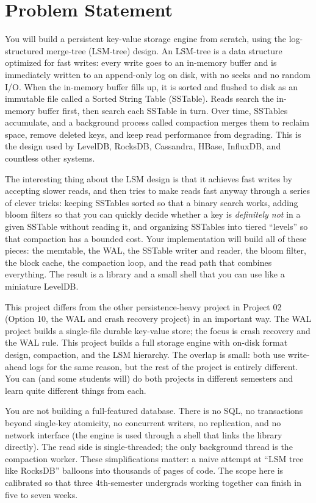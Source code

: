 \documentclass[11pt,a4paper]{article}
\begin{document}

\section{Problem Statement}

You will build a persistent key-value storage engine from scratch, using the log-structured merge-tree (LSM-tree) design. An LSM-tree is a data structure optimized for fast writes: every write goes to an in-memory buffer and is immediately written to an append-only log on disk, with no seeks and no random I/O. When the in-memory buffer fills up, it is sorted and flushed to disk as an immutable file called a Sorted String Table (SSTable). Reads search the in-memory buffer first, then search each SSTable in turn. Over time, SSTables accumulate, and a background process called compaction merges them to reclaim space, remove deleted keys, and keep read performance from degrading. This is the design used by LevelDB, RocksDB, Cassandra, HBase, InfluxDB, and countless other systems.

The interesting thing about the LSM design is that it achieves fast writes by accepting slower reads, and then tries to make reads fast anyway through a series of clever tricks: keeping SSTables sorted so that a binary search works, adding bloom filters so that you can quickly decide whether a key is \textit{definitely not} in a given SSTable without reading it, and organizing SSTables into tiered ``levels'' so that compaction has a bounded cost. Your implementation will build all of these pieces: the memtable, the WAL, the SSTable writer and reader, the bloom filter, the block cache, the compaction loop, and the read path that combines everything. The result is a library and a small shell that you can use like a miniature LevelDB.

This project differs from the other persistence-heavy project in Project 02 (Option 10, the WAL and crash recovery project) in an important way. The WAL project builds a single-file durable key-value store; the focus is crash recovery and the WAL rule. This project builds a full storage engine with on-disk format design, compaction, and the LSM hierarchy. The overlap is small: both use write-ahead logs for the same reason, but the rest of the project is entirely different. You can (and some students will) do both projects in different semesters and learn quite different things from each.

You are not building a full-featured database. There is no SQL, no transactions beyond single-key atomicity, no concurrent writers, no replication, and no network interface (the engine is used through a shell that links the library directly). The read side is single-threaded; the only background thread is the compaction worker. These simplifications matter: a naive attempt at ``LSM tree like RocksDB'' balloons into thousands of pages of code. The scope here is calibrated so that three 4th-semester undergrads working together can finish in five to seven weeks.
\end{document}
